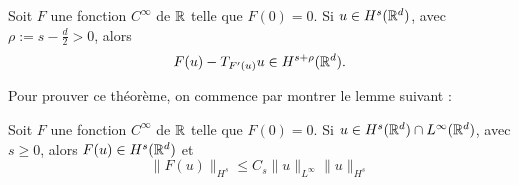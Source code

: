 \documentclass[11pt,a4paper]{article}
\begin{document}
\begin{thm}\label{paralin}
Soit $F$ une fonction $C^{\infty}$ de $\mathbb R$ telle que $F(0)=0$. Si $u\in H^s(\mathbb R^d)$, avec $\rho := s - \frac{d}{2}>0 $, alors 
\begin{equation}
F(u) - T_{F'(u)}u \in H^{s+\rho}(\mathbb R^d).
\end{equation}
\end{thm}
Pour prouver ce théorème, on commence par montrer le lemme suivant : 


\begin{lemma}\label{lem_paralin}
Soit $F$ une fonction $C^{\infty}$ de $\mathbb R$ telle que $F(0)=0$. Si $u\in H^s(\mathbb R^d)\cap L^{\infty}(\mathbb R^d) $, avec $s\geq 0 $, alors $F(u) \in H^s(\mathbb R^d)$ et 
\begin{equation}
\|F(u)\|_{H^s} \leq C_s \|u\|_{L^{\infty}} \|u\|_{H^s}
\end{equation}
\end{lemma}
\end{document}
